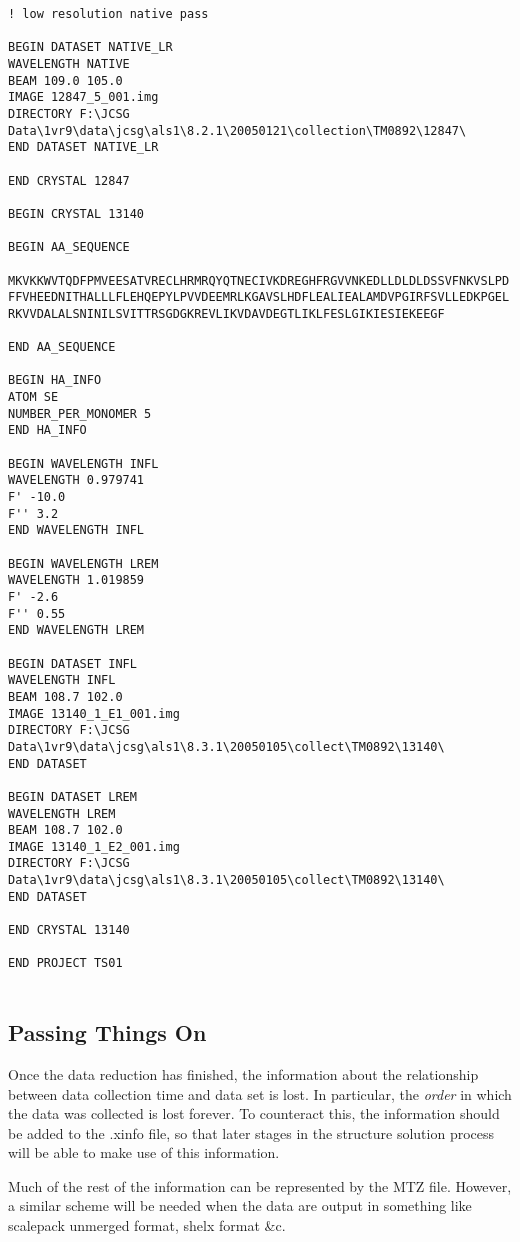 \documentclass[a4paper, 11pt]{article}
\begin{document}
{\begin{verbatim}
! low resolution native pass

BEGIN DATASET NATIVE_LR
WAVELENGTH NATIVE
BEAM 109.0 105.0
IMAGE 12847_5_001.img
DIRECTORY F:\JCSG Data\1vr9\data\jcsg\als1\8.2.1\20050121\collection\TM0892\12847\
END DATASET NATIVE_LR

END CRYSTAL 12847

BEGIN CRYSTAL 13140

BEGIN AA_SEQUENCE

MKVKKWVTQDFPMVEESATVRECLHRMRQYQTNECIVKDREGHFRGVVNKEDLLDLDLDSSVFNKVSLPD
FFVHEEDNITHALLLFLEHQEPYLPVVDEEMRLKGAVSLHDFLEALIEALAMDVPGIRFSVLLEDKPGEL
RKVVDALALSNINILSVITTRSGDGKREVLIKVDAVDEGTLIKLFESLGIKIESIEKEEGF

END AA_SEQUENCE

BEGIN HA_INFO
ATOM SE
NUMBER_PER_MONOMER 5
END HA_INFO

BEGIN WAVELENGTH INFL
WAVELENGTH 0.979741
F' -10.0
F'' 3.2
END WAVELENGTH INFL

BEGIN WAVELENGTH LREM
WAVELENGTH 1.019859
F' -2.6
F'' 0.55
END WAVELENGTH LREM

BEGIN DATASET INFL
WAVELENGTH INFL
BEAM 108.7 102.0
IMAGE 13140_1_E1_001.img
DIRECTORY F:\JCSG Data\1vr9\data\jcsg\als1\8.3.1\20050105\collect\TM0892\13140\
END DATASET

BEGIN DATASET LREM
WAVELENGTH LREM
BEAM 108.7 102.0
IMAGE 13140_1_E2_001.img
DIRECTORY F:\JCSG Data\1vr9\data\jcsg\als1\8.3.1\20050105\collect\TM0892\13140\
END DATASET

END CRYSTAL 13140

END PROJECT TS01


\end{verbatim}
}

\subsection{Passing Things On}

Once the data reduction has finished, the information about the relationship
between data collection time and data set is lost. In particular, the
\emph{order} in which the data was collected is lost forever. To counteract
this, the information should be added to the .xinfo file, so that later
stages in the structure solution process will be able to make use of this 
information.

Much of the rest of the information can be represented by the MTZ file.
However, a similar scheme will be needed when the data are output in 
something like scalepack unmerged format, shelx format \&c.
\end{document}
